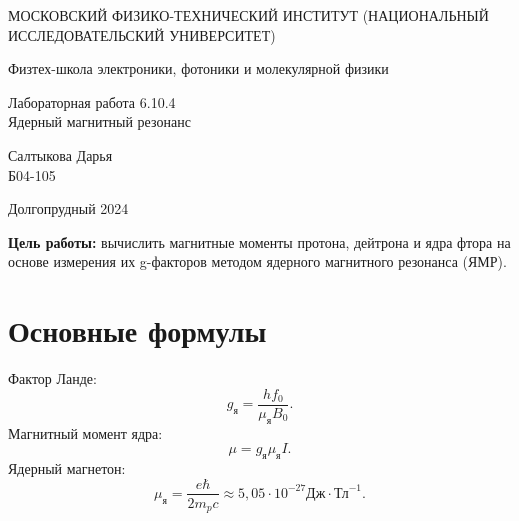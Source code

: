 \documentclass[a4paper,12pt]{article} %
\begin{document}
	
	\begin{titlepage}
	\begin{center}
		{\large МОСКОВСКИЙ ФИЗИКО-ТЕХНИЧЕСКИЙ ИНСТИТУТ (НАЦИОНАЛЬНЫЙ ИССЛЕДОВАТЕЛЬСКИЙ УНИВЕРСИТЕТ)}
	\end{center}
	\begin{center}
		{\large Физтех-школа электроники, фотоники и молекулярной физики}
	\end{center}
	
	
	\vspace{4.5cm}
	{\huge
		\begin{center}
			{Лабораторная работа 6.10.4}\\
			Ядерный магнитный резонанс
		\end{center}
	}
	\vspace{2cm}
	\begin{flushright}
		{\LARGE Салтыкова Дарья \\
			\vspace{0.5cm}
			Б04-105}
	\end{flushright}
	\vspace{8cm}
	\begin{center}
		Долгопрудный 2024
	\end{center}
\end{titlepage}

\noindent \textbf{Цель работы:} вычислить магнитные моменты протона, дейтрона и ядра фтора
на основе измерения их g-факторов методом ядерного магнитного резонанса (ЯМР).

\section{Основные формулы}
	\noindent Фактор Ланде:
	\begin{equation*}
		\label{eq:g}
		\tag{$\star$}
		g_\text{я} = \frac{hf_0}{\mu_\text{я}B_0}.
	\end{equation*}
	Магнитный момент ядра:
	\begin{equation*}
		\label{eq:mu}
		\tag{$\star\star$}
		\mu = g_\text{я}\mu_\text{я}I.
	\end{equation*}
	Ядерный магнетон:
	\begin{equation*}
		\mu_{\text{я}} = \frac{e\hbar}{2m_pc} \approx 5,05\cdot10^{-27} \text{Дж}\cdot\text{Тл}^{-1}.
	\end{equation*}
\end{document}

